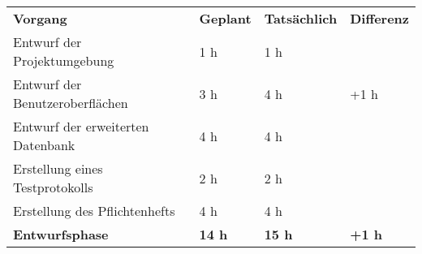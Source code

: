 \begin{tabularx}{\textwidth}{Xlll}
\rowcolor{heading}\textbf{Vorgang} & \textbf{Geplant} & \textbf{Tatsächlich} & \textbf{Differenz} \\
Entwurf der Projektumgebung & 1 h & 1 h &  \\
\rowcolor{odd}Entwurf der Benutzeroberflächen & 3 h & 4 h & +1 h \\
Entwurf der erweiterten Datenbank & 4 h & 4 h &  \\
\rowcolor{odd}Erstellung eines Testprotokolls & 2 h & 2 h &  \\
Erstellung des Pflichtenhefts & 4 h & 4 h &  \\
\hline
\hline
\rowcolor{heading}\textbf{Entwurfsphase} & \textbf{14 h} & \textbf{15 h} & \textbf{+1 h} \\
\end{tabularx}
